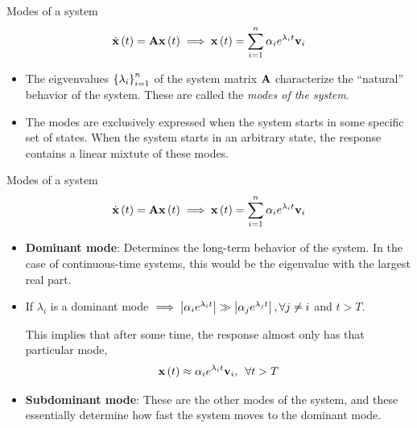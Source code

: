 \documentclass[aspectratio=169]{beamer}
\def\mf{\ensuremath\mathbf}
\def\lp{\ensuremath\left(}
\def\rp{\ensuremath\right)}
\def\lv{\ensuremath\left\lvert}
\def\rv{\ensuremath\right\rvert}
\def\lc{\ensuremath\left\{}
\def\rc{\ensuremath\right\}}
\newcommand{\ct}[1]{\lp #1\rp}
\begin{document}
\begin{frame}[t]{Modes of a system}
\vspace{-0.5cm}
\[ \dot{\mf{x}}\ct{t} = \mf{A}\mf{x}\ct{t} \implies \mf{x}\ct{t} = \sum_{i=1}^n \alpha_ie^{\lambda_it}\mf{v}_i \]
\vspace{-0.5cm}

\begin{itemize}
    \item The eigvenvalues $\lc \lambda_i\rc_{i=1}^n$ of the system matrix $\mf{A}$ characterize the ``natural'' behavior of the system. These are called the \textit{modes of the system}.

    \item The modes are exclusively expressed when the system starts in some specific set of states. When the system starts in an arbitrary state, the  response contains a linear mixtute of these modes.
\end{itemize}
\end{frame}


\begin{frame}[t]{Modes of a system}
\vspace{-0.5cm}
\[ \dot{\mf{x}}\ct{t} = \mf{A}\mf{x}\ct{t} \implies \mf{x}\ct{t} = \sum_{i=1}^n \alpha_ie^{\lambda_it}\mf{v}_i \]
\vspace{-0.5cm}

\begin{itemize}
    \item \textbf{Dominant mode}: Determines the long-term behavior of the system. In the case of continuous-time systems, this would be the eigenvalue with the largest real part.

    \item If $\lambda_i$ is a dominant mode $\implies \lv \alpha_ie^{\lambda_it} \rv \gg \lv \alpha_je^{\lambda_jt} \rv, \forall j \neq i$ and $t > T$.

    This implies that after some time, the response almost only has that particular mode,
    \[ \mf{x}\ct{t} \approx \alpha_ie^{\lambda_i t}\mf{v}_i, \,\,\, \forall t > T \]

    \item \textbf{Subdominant mode}: These are the other modes of the system, and these essentially determine how fast the system moves to the dominant mode.
\end{itemize}
\end{frame}
\end{document}
